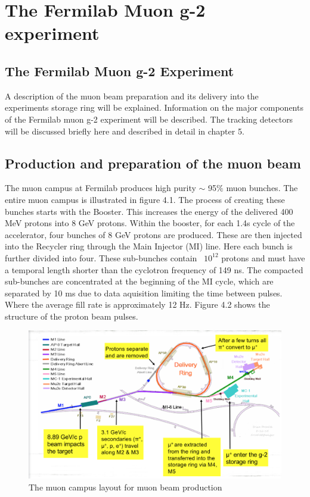 
\chapter{The Fermilab Muon g-2 experiment} %

\label{Chapter3} %

\section{The Fermilab Muon g-2 Experiment}

A description of the muon beam preparation and its delivery into the experiments storage ring will be explained. Information on the major components of the Fermilab muon g-2 experiment will be described. The tracking detectors will be discussed briefly here and described in detail in chapter 5.

\section{Production and preparation of the muon beam}

The muon campus at Fermilab produces high purity $\sim$ 95$\%$ muon bunches. The entire muon campus is illustrated in figure 4.1. The process of creating these bunches starts with the Booster. This increases the energy of the delivered 400 MeV protons into 8 GeV protons. Within the booster, for each 1.4s cycle of the accelerator, four bunches of 8 GeV protons are produced. These are then injected into the Recycler ring through the Main Injector (MI) line. Here each bunch is further divided into four. These sub-bunches contain ~$10^{12}$ protons and must have a temporal length shorter than the cyclotron frequency of 149 ns. The compacted sub-bunches are concentrated at the beginning of the MI cycle, which are separated by 10 ms due to data aquisition limiting the time between pulses. Where the average fill rate is approximately 12 Hz. Figure 4.2 shows the structure of the proton beam pulses.

\begin{figure}[th]
\centering
\includegraphics[scale=0.45]{Figures/muonbeamproduction}
\decoRule
\caption{The muon campus layout for muon beam production}
\label{fig:muonbeamproduction}
\end{figure}

